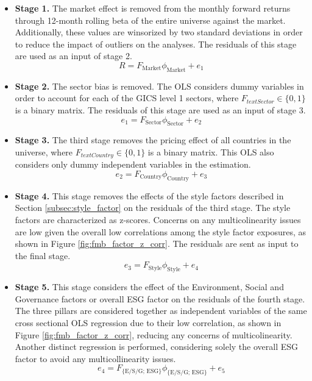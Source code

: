 \documentclass[11pt,a4paper]{article}
\begin{document}
\begin{itemize}[label=$\circ$]
    \item \textbf{Stage 1.} The market effect is removed from the monthly forward returns through 12-month rolling beta of the entire universe against the market. Additionally, these values are winsorized by two standard deviations in order to reduce the impact of outliers on the analyses. The residuals of this stage are used as an input of stage 2.
    \begin{equation}
        R = F_{\text{Market}} \phi_{\text{Market}} + e_{1}
    \end{equation}
    \item \textbf{Stage 2.} The sector bias is removed. The OLS considers dummy variables in order to account for each of the GICS level 1 sectors, where $F_{text{Sector}}\in \{0, 1\}$ is a binary matrix. The residuals of this stage are used as an input of stage 3.
    \begin{equation}
        e_{1} = F_{\text{Sector}} \phi_{\text{Sector}} + e_{2}
    \end{equation}
    \item \textbf{Stage 3.} The third stage removes the pricing effect of all countries in the universe, where $F_{text{Country}}\in \{0, 1\}$ is a binary matrix. This OLS also considers only dummy independent variables in the estimation.
    \begin{equation}
        e_{2} = F_{\text{Country}} \phi_{\text{Country}} + e_{3}
    \end{equation}
    \item \textbf{Stage 4.} This stage removes the effects of the style factors described in Section \ref{subsec:style_factor} on the residuals of the third stage. The style factors are characterized as z-scores.
    Concerns on any multicolinearity issues are low given the overall low correlations among the style factor exposures,  as shown in Figure \ref{fig:fmb_factor_z_corr}. The residuals are sent as input to the final stage.
    \begin{equation}
        e_{3} = F_{\text{Style}} \phi_{\text{Style}} + e_{4}
    \end{equation}   
    \item \textbf{Stage 5.} This stage considers the effect of the Environment, Social and Governance factors or overall ESG factor on the residuals of the fourth stage. 
    The three pillars are considered together as independent variables of the same cross sectional OLS regression due to their low correlation, as shown in Figure \ref{fig:fmb_factor_z_corr}, reducing any concerns of multicolinearity. 
    Another distinct regression is performed, considering solely the overall ESG factor to avoid any multicollinearity issues.
    \begin{equation}
        e_{4} = F_{\text{\{E/S/G; ESG\}}} \phi_{\text{\{E/S/G; ESG\}}} + e_{5}
    \end{equation}  
\end{itemize}
\end{document}
